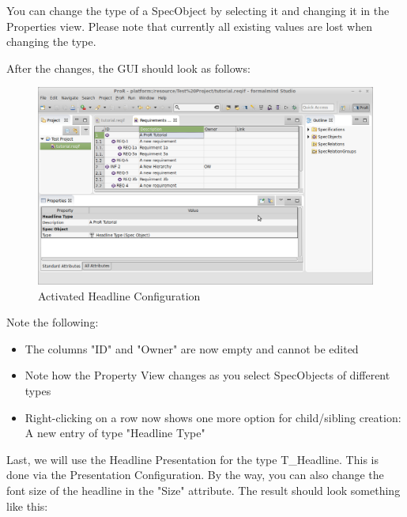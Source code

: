 You can change the type of a SpecObject by selecting it and changing it
in the Properties view.  Please note that currently all existing values
are lost when changing the type.

After the changes, the GUI should look as follows:

\begin{figure}[h!]
\centering      
\includegraphics[width=\linewidth]{../rmf-images/desc_headline.png}      
\caption{Activated Headline Configuration}      
\label{fig:activeHeadlineConfig}
\end{figure}

Note the following:

\begin{itemize}
\item
  The columns "ID" and "Owner" are now empty and cannot be edited
\item
  Note how the Property View changes as you select SpecObjects of
  different types
\item
  Right-clicking on a row now shows one more option for child/sibling
  creation: A new entry of type "Headline Type"
\end{itemize}

Last, we will use the Headline Presentation for the type T\_Headline.
This is done via the Presentation Configuration.  By the way, you can also change the font size of the headline in the "Size" attribute. The result should look something like this:

